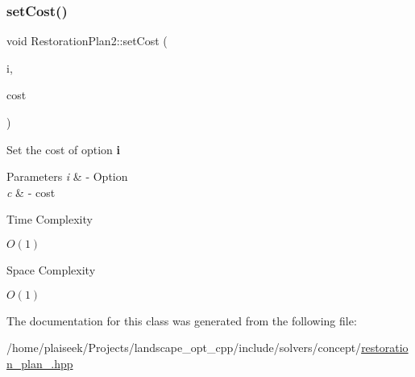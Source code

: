 \subsubsection{\texorpdfstring{set\+Cost()}{setCost()}}
{\footnotesize\ttfamily void Restoration\+Plan2\+::set\+Cost (\begin{DoxyParamCaption}\item[{\hyperlink{class_restoration_plan2_aff164a2726831342bf87af5e11df1064}{Option}}]{i,  }\item[{double}]{cost }\end{DoxyParamCaption})\hspace{0.3cm}{\ttfamily [inline]}}



Set the cost of option {\bfseries i} 


\begin{DoxyParams}{Parameters}
{\em i} & -\/ Option \\
\hline
{\em c} & -\/ cost \\
\hline
\end{DoxyParams}
\begin{DoxyRefDesc}{Time Complexity}
\item[\hyperlink{time__time000024}{Time Complexity}]$O(1)$ \end{DoxyRefDesc}
\begin{DoxyRefDesc}{Space Complexity}
\item[\hyperlink{space__space000024}{Space Complexity}]$O(1)$ \end{DoxyRefDesc}


The documentation for this class was generated from the following file\+:\begin{DoxyCompactItemize}
\item 
/home/plaiseek/\+Projects/landscape\+\_\+opt\+\_\+cpp/include/solvers/concept/\hyperlink{restoration__plan__2_8hpp}{restoration\+\_\+plan\+\_.\+hpp}\end{DoxyCompactItemize}
